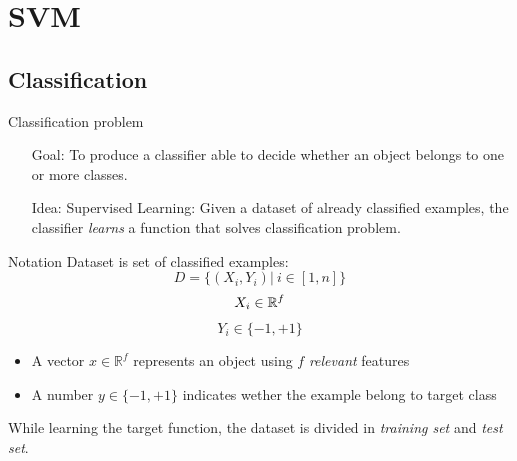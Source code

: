 \section{SVM}
\subsection{Classification}
\begin{frame}{Classification problem}
	\begin{itemize}\setlength\itemsep{1em}
		\item[Goal:] To produce a classifier able to decide whether an object belongs to one or more classes.
		\item[Idea:] Supervised Learning: Given a dataset of already classified examples, the classifier \textit{learns} a function that solves classification problem.
	\end{itemize}
\end{frame}

\begin{frame}{Notation}
	Dataset is set of classified examples:
	$$D = \{(X_i, Y_i) | \ i \in [1, n]\}$$
	$$X_i \in \mathbb{R}^f$$
	$$Y_i \in \{-1, +1\}$$
	\begin{itemize}\setlength\itemsep{1em}
		\item A vector $x \in \mathbb{R}^f$ represents an object using $f$ \textit{relevant} features
		\item A number $y \in \{-1 , +1\}$ indicates wether the example belong to target class
	\end{itemize}
	
	While learning the target function, the dataset is divided in \textit{training set} and \textit{test set}.
\end{frame}


